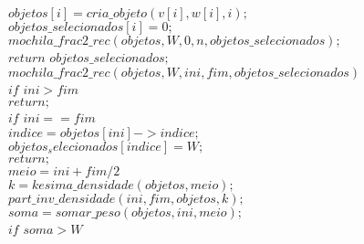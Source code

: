 \documentclass[10pt,a4paper]{article}
\begin{document}
	\hspace{2cm}$objetos[i] = cria\_objeto(v[i],w[i],i);$\\
	
	\hspace{2cm}$objetos\_selecionados[i] = 0;$\\

	\hspace{1cm}$mochila\_frac2\_rec(objetos, W, 0, n, objetos\_selecionados);$\\

	\hspace{1cm}$return$ $objetos\_selecionados;$\\
	
	
	$mochila\_frac2\_rec(objetos,W,ini,fim, objetos\_selecionados)$\\

	\hspace{1cm}$if$ $ini > fim$\\

	\hspace{2cm}$return;$\\
	

	\hspace{1cm}$if$ $ini == fim$\\

	\hspace{2cm}$indice = objetos[ini]->indice;$\\
	
	\hspace{2cm}$objetos_selecionados[indice] = W;$\\
	
	\hspace{2cm}$return;$\\
	
	\hspace{1cm}$meio = ini+fim/2$\\
	
	\hspace{1cm}$k = kesima\_densidade(objetos, meio);$\\
	
	\hspace{1cm}$part\_inv\_densidade(ini,fim,objetos,k);$\\
	
	\hspace{1cm}$soma = somar\_peso(objetos,ini,meio);$\\
	
	\hspace{1cm}$if$ $soma > W$\\
	
\end{document}
